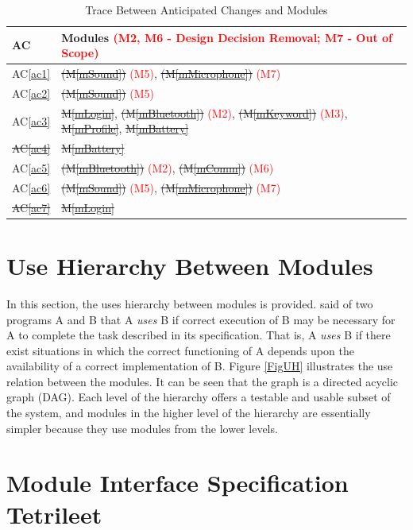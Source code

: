 \documentclass[12pt, titlepage]{article}
\newcommand{\acref}[1]{AC\ref{#1}}
\newcommand{\mref}[1]{M\ref{#1}}
\begin{document}
\begin{table}[H]
\centering
\begin{tabular}{p{} p{}}
\toprule
\textbf{AC} & \textbf{Modules \textcolor{red}{(M2, M6 - Design Decision Removal; M7 - Out of Scope)}}\\
\midrule
\acref{ac1} & \sout{(\mref{mSound})} \textcolor{red}{(M5)}, \sout{(\mref{mMicrophone})} \textcolor{red}{(M7)}\\
\acref{ac2} & \sout{(\mref{mSound})} \textcolor{red}{(M5)}\\
\acref{ac3} & \sout{\mref{mLogin}}, \sout{(\mref{mBluetooth})} \textcolor{red}{(M2)}, \sout{(\mref{mKeyword})} \textcolor{red}{(M3)}, \sout{\mref{mProfile}}, \sout{\mref{mBattery}}\\
\sout{\acref{ac4}} & \sout{\mref{mBattery}}\\
\acref{ac5} & \sout{(\mref{mBluetooth})} \textcolor{red}{(M2)}, \sout{(\mref{mComm})} \textcolor{red}{(M6)}\\
\acref{ac6} & \sout{(\mref{mSound})} \textcolor{red}{(M5)}, \sout{(\mref{mMicrophone})} \textcolor{red}{(M7)}\\
\sout{\acref{ac7}} & \sout{\mref{mLogin}}\\
\bottomrule
\end{tabular}
\caption{Trace Between Anticipated Changes and Modules}
\label{TblACT}
\end{table}

\section{Use Hierarchy Between Modules} \label{SecUse}

In this section, the uses hierarchy between modules is
provided. \citet{Parnas1978} said of two programs A and B that A {\em uses} B if
correct execution of B may be necessary for A to complete the task described in
its specification. That is, A {\em uses} B if there exist situations in which
the correct functioning of A depends upon the availability of a correct
implementation of B.  Figure \ref{FigUH} illustrates the use relation between
the modules. It can be seen that the graph is a directed acyclic graph
(DAG). Each level of the hierarchy offers a testable and usable subset of the
system, and modules in the higher level of the hierarchy are essentially simpler
because they use modules from the lower levels.

\section{Module Interface Specification Tetrileet}
\end{document}
